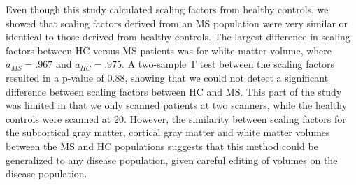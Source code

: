 Even though this study calculated scaling factors from healthy controls, we showed that scaling factors derived from an MS population were very similar or identical to those derived from healthy controls. The largest difference in scaling factors between HC versus MS patients was for white matter volume, where $a_{MS} = .967$ and $a_{HC} = .975$. A two-sample T test between the scaling factors resulted in a p-value of $0.88$, showing that we could not detect a significant difference between scaling factors between HC and MS. This part of the study was limited in that we only scanned patients at two scanners, while the healthy controls were scanned at 20. However, the similarity between scaling factors for the subcortical gray matter, cortical gray matter and white matter volumes between the MS and HC populations suggests that this method could be generalized to any disease population, given careful editing of volumes on the disease population.